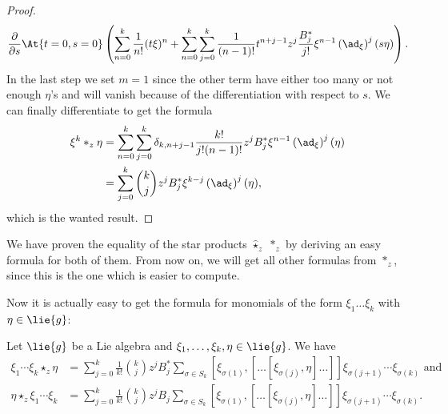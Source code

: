\begin{proof}
\begin{align*}
        \frac{\partial}{\partial s}
        \At{t=0, s=0}
        \left(
            \sum\limits_{n=0}^{k}
            \frac{1}{n!}
            (t \xi)^n
            +
            \sum\limits_{n=0}^{k}
            \sum\limits_{j=0}^k
            \frac{1}{(n - 1)!} t^{n + j - 1}
            z^j \frac{B_j^*}{j!}
            \xi^{n - 1}
            \left( \ad_{\xi} \right)^j
            (s \eta)
        \right).
    \end{align*}
    In the last step we set $m = 1$ since the other term have either too
    many or not enough $\eta$'s and will vanish because of the differentiation 
    with respect to $s$. We can finally differentiate to get the formula
    \begin{align*}
        \xi^k \ast_z \eta
        & =
        \sum\limits_{n=0}^k
        \sum\limits_{j=0}^k
        \delta_{k, n + j - 1}
        \frac{k!}{j! (n - 1)!}
        z^j B_j^*
        \xi^{n - 1}
        \left(\ad_{\xi}\right)^j
        (\eta)
        \\
        & =
        \sum\limits_{j=0}^k
        \binom{k}{j}
        z^j B_j^*
        \xi^{k - j}
        \left( \ad_{\xi} \right)^j
        (\eta),
    \end{align*}
    which is the wanted result.
\end{proof}
\begin{remark}
    We have proven the equality of the  star products $\widehat{\star}_z$
    $\ast_z$ by deriving an easy formula for both of them. From now on, we 
    will get all other formulas from $\ast_z$, since this is the 
    one which is easier to compute.
\end{remark}
Now it is actually easy to get the formula for monomials of the form $\xi_1 \ldots \xi_k$ with $\eta \in \lie{g}$:
\begin{proposition}
	\label{Formulas:Prop:LinearMonomial2}
    Let $\lie{g}$ be a Lie algebra and $\xi_1, \ldots, \xi_k, \eta \in 
    \lie{g}$. We have
    \begin{align}
    		\label{Formulas:LinearMonomial2}
	    	\xi_1 \cdots \xi_k \star_z \eta
    		& =
    		\sum\limits_{j=0}^k
    		\frac{1}{k!} \binom{k}{j}
    		z^j B_j^*
    		\sum\limits_{\sigma \in S_k}
    		[\xi_{\sigma(1)}, 
    			[ \ldots [\xi_{\sigma(j)}, \eta] \ldots ]
    		]
    		\xi_{\sigma(j+1)} \cdots \xi_{\sigma(k)} \text{ and}
    		\\
		\label{Formulas:LinearMonomial2T}
	    	\eta \star_z \xi_1 \cdots \xi_k
    		& =
    		\sum\limits_{j=0}^k
    		\frac{1}{k!} \binom{k}{j}
    		z^j B_j
    		\sum\limits_{\sigma \in S_k}
    		[\xi_{\sigma(1)}, 
    			[ \ldots [\xi_{\sigma(j)}, \eta] \ldots ]
    		]
    		\xi_{\sigma(j+1)} \cdots \xi_{\sigma(k)}.
    \end{align}
\end{proposition}
